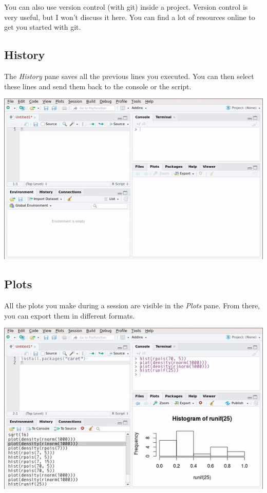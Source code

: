 \documentclass[]{gitbook}
\begin{document}
You can also use version control (with git) inside a project. Version control is very useful, but
I won't discuss it here. You can find a lot of resources online to get you started with git.

\hypertarget{history}{%
\subsection{History}\label{history}}

The \emph{History} pane saves all the previous lines you executed. You can then select these lines and
send them back to the console or the script.

\includegraphics{pics/rstudio_history.gif}

\hypertarget{plots}{%
\subsection{Plots}\label{plots}}

All the plots you make during a session are visible in the \emph{Plots} pane. From there, you can
export them in different formats.

\includegraphics{pics/rstudio_plots.gif}
\end{document}
